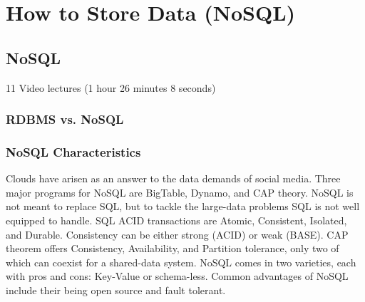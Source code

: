 \part{How to Store Data (NoSQL)}
\label{sec:icloud-nosql}



\chapter{NoSQL}

\FILENAME

  11 Video lectures (1 hour 26 minutes 8 seconds)

\section{RDBMS vs. NoSQL}




\section{NoSQL Characteristics}

Clouds have arisen as an answer to the data demands of social media.
Three major programs for NoSQL are BigTable, Dynamo, and CAP theory.
NoSQL is not meant to replace SQL, but to tackle the large-data problems
SQL is not well equipped to handle. SQL ACID transactions are Atomic,
Consistent, Isolated, and Durable. Consistency can be either strong
(ACID) or weak (BASE). CAP theorem offers Consistency, Availability, and
Partition tolerance, only two of which can coexist for a shared-data
system. NoSQL comes in two varieties, each with pros and cons: Key-Value
or schema-less. Common advantages of NoSQL include their being open
source and fault tolerant.




